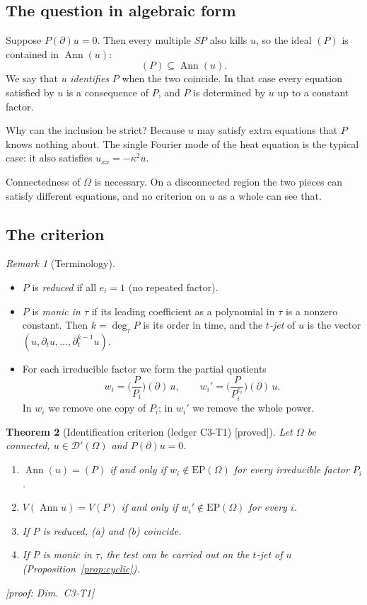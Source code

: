 \documentclass[11pt]{article}
\theoremstyle{plain}
\newtheorem{theorem}{Theorem}[section]
\theoremstyle{definition}
\theoremstyle{remark}
\newtheorem{remark}[theorem]{Remark}
\DeclareMathOperator{\Ann}{Ann}             %
\newcommand{\Var}{V}                        %
\newcommand{\EP}{\mathrm{EP}}               %
\newcommand{\badge}[2]{\textcolor{#1}{\textsf{\footnotesize[#2]}}}
\newcommand{\proved}[1][]{\badge{cC}{proved#1}}
\newcommand{\led}[1]{\textcolor{cG}{\textsf{\footnotesize(ledger #1)}}}
\newenvironment{notebox}[1]{\begin{remark}[#1]}{\end{remark}}
\newcommand{\dimref}[1]{\textsf{\footnotesize[proof: Dim.~#1]}}
\begin{document}
\subsection{The question in algebraic form}

Suppose $P(\partial)u=0$. Then every multiple $SP$ also kills $u$, so the ideal $(P)$ is contained in $\Ann(u)$:
\[
(P)\subseteq\Ann(u).
\]
We say that $u$ \emph{identifies} $P$ when the two coincide. In that case every equation satisfied by $u$ is a consequence of $P$, and $P$ is determined by $u$ up to a constant factor.

Why can the inclusion be strict? Because $u$ may satisfy extra equations that $P$ knows nothing about. The single Fourier mode of the heat equation is the typical case: it also satisfies $u_{xx}=-\kappa^2u$.

Connectedness of $\Omega$ is necessary. On a disconnected region the two pieces can satisfy different equations, and no criterion on $u$ as a whole can see that.

\subsection{The criterion}

\begin{notebox}{Terminology}
\begin{itemize}
\item $P$ is \emph{reduced} if all $e_i=1$ (no repeated factor).
\item $P$ is \emph{monic in $\tau$} if its leading coefficient as a polynomial in $\tau$ is a nonzero constant. Then $k=\deg_\tau P$ is its order in time, and the \emph{$t$-jet} of $u$ is the vector $(u,\partial_tu,\dots,\partial_t^{k-1}u)$.
\item For each irreducible factor we form the partial quotients
\[
w_i=\Big(\frac{P}{P_i}\Big)(\partial)\,u,\qquad
w_i'=\Big(\frac{P}{P_i^{e_i}}\Big)(\partial)\,u .
\]
In $w_i$ we remove one copy of $P_i$; in $w_i'$ we remove the whole power.
\end{itemize}
\end{notebox}

\begin{theorem}[{Identification criterion \led{C3-T1} \proved}]\label{f:thm:ident}
Let $\Omega$ be connected, $u\in\mathcal D'(\Omega)$ and $P(\partial)u=0$.
\begin{enumerate}[label=(\alph*)]
\item $\Ann(u)=(P)$ if and only if $w_i\notin\EP(\Omega)$ for every irreducible factor $P_i$.
\item $\Var(\Ann u)=\Var(P)$ if and only if $w_i'\notin\EP(\Omega)$ for every $i$.
\item If $P$ is reduced, (a) and (b) coincide.
\item If $P$ is monic in $\tau$, the test can be carried out on the $t$-jet of $u$ (Proposition~\ref{prop:cyclic}).
\end{enumerate}
\dimref{C3-T1}
\end{theorem}
\end{document}
